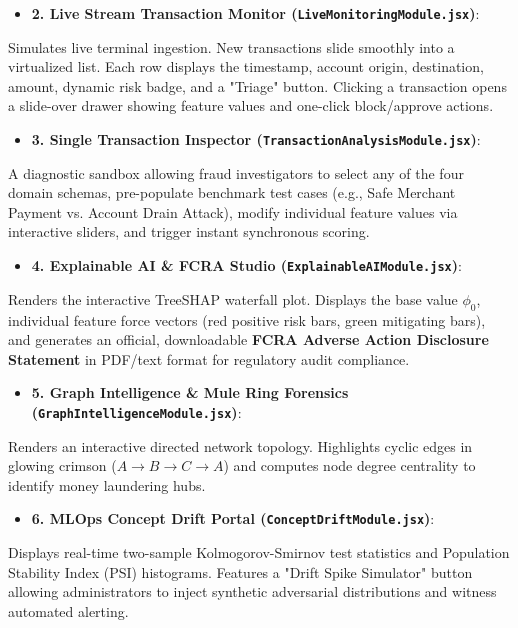 \documentclass[12pt,a4paper,oneside]{report}
\begin{document}
\begin{itemize}[leftmargin=0.35in]
\item \textbf{2. Live Stream Transaction Monitor (\texttt{LiveMonitoringModule.jsx})}:
\end{itemize}
Simulates live terminal ingestion. New transactions slide smoothly into a virtualized list. Each row displays the timestamp, account origin, destination, amount, dynamic risk badge, and a "Triage" button. Clicking a transaction opens a slide-over drawer showing feature values and one-click block/approve actions.

\begin{itemize}[leftmargin=0.35in]
\item \textbf{3. Single Transaction Inspector (\texttt{TransactionAnalysisModule.jsx})}:
\end{itemize}
A diagnostic sandbox allowing fraud investigators to select any of the four domain schemas, pre-populate benchmark test cases (e.g., Safe Merchant Payment vs. Account Drain Attack), modify individual feature values via interactive sliders, and trigger instant synchronous scoring.

\begin{itemize}[leftmargin=0.35in]
\item \textbf{4. Explainable AI \& FCRA Studio (\texttt{ExplainableAIModule.jsx})}:
\end{itemize}
Renders the interactive TreeSHAP waterfall plot. Displays the base value $\phi_0$, individual feature force vectors (red positive risk bars, green mitigating bars), and generates an official, downloadable \textbf{FCRA Adverse Action Disclosure Statement} in PDF/text format for regulatory audit compliance.

\begin{itemize}[leftmargin=0.35in]
\item \textbf{5. Graph Intelligence \& Mule Ring Forensics (\texttt{GraphIntelligenceModule.jsx})}:
\end{itemize}
Renders an interactive directed network topology. Highlights cyclic edges in glowing crimson ($A \rightarrow B \rightarrow C \rightarrow A$) and computes node degree centrality to identify money laundering hubs.

\begin{itemize}[leftmargin=0.35in]
\item \textbf{6. MLOps Concept Drift Portal (\texttt{ConceptDriftModule.jsx})}:
\end{itemize}
Displays real-time two-sample Kolmogorov-Smirnov test statistics and Population Stability Index (PSI) histograms. Features a "Drift Spike Simulator" button allowing administrators to inject synthetic adversarial distributions and witness automated alerting.
\end{document}
